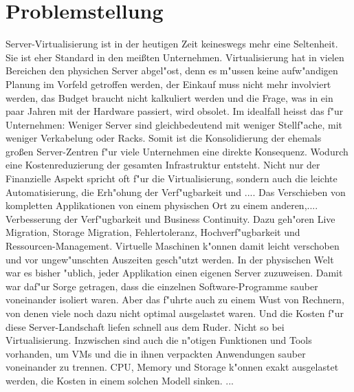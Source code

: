 \section{Problemstellung}
Server-Virtualisierung ist in der heutigen Zeit keineswegs mehr eine Seltenheit. Sie ist eher Standard in den mei{\ss}ten Unternehmen.\newline
Virtualisierung hat in vielen Bereichen den physichen Server abgel"ost, denn es m"ussen keine aufw"andigen Planung im Vorfeld getroffen werden, der Einkauf muss nicht mehr involviert werden, das Budget braucht nicht kalkuliert werden und die Frage, was in ein paar Jahren mit der Hardware passiert, wird obsolet.\newline
Im idealfall heisst das f"ur Unternehmen: Weniger Server sind gleichbedeutend mit weniger Stellf"ache, mit weniger Verkabelung oder Racks. Somit ist die Konsolidierung der ehemals gro{\ss}en Server-Zentren f"ur viele Unternehmen eine direkte Konsequenz. 
Wodurch eine Kostenreduzierung der gesamten Infrastruktur entsteht.\newline
Nicht nur der Finanzielle Aspekt spricht oft f"ur die Virtualisierung, sondern auch die leichte Automatisierung, die Erh"ohung der Verf"ugbarkeit und ....\newline
Das Verschieben von kompletten Applikationen von einem physischen Ort zu einem anderen,....\newline
Verbesserung der Verf"ugbarkeit und Business Continuity. Dazu geh"oren Live Migration, Storage Migration, Fehlertoleranz, Hochverf"ugbarkeit und Ressourcen-Management. Virtuelle Maschinen k"onnen damit leicht verschoben und vor ungew"unschten Auszeiten gesch"utzt werden.\newline
In der physischen Welt war es bisher "ublich, jeder Applikation einen eigenen Server zuzuweisen. Damit war daf"ur Sorge getragen, dass die einzelnen Software-Programme sauber voneinander isoliert waren. Aber das f"uhrte auch zu einem Wust von Rechnern, von denen viele noch dazu nicht optimal ausgelastet waren. Und die Kosten f"ur diese Server-Landschaft liefen schnell aus dem Ruder. Nicht so bei Virtualisierung. Inzwischen sind auch die n"otigen Funktionen und Tools vorhanden, um VMs und die in ihnen verpackten Anwendungen sauber voneinander zu trennen. CPU, Memory und Storage k"onnen exakt ausgelastet werden, die Kosten in einem solchen Modell sinken.\newline
...

